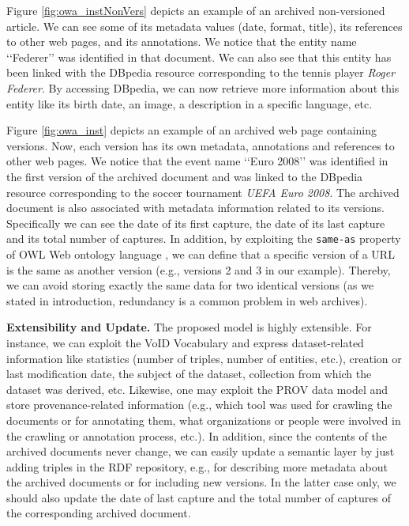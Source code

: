 \documentclass{libtex/sig-alternate-05-2015}
\newcommand{\q}[1]{\lq\lq{}{}#1\rq\rq{}{}}
\begin{document}
Figure \ref{fig:owa_instNonVers} depicts an example of an archived non-versioned article.
We can see some of its metadata values (date, format, title),
its references to other web pages, and its annotations.
We notice that the entity name \q{Federer} was identified
in that document.
We can also see that this entity has been linked with the DBpedia resource
corresponding to the tennis player {\em Roger Federer}.
By accessing DBpedia, we can now retrieve more information about this entity
like its birth date, an image, a description in a specific language, etc.

Figure \ref{fig:owa_inst} depicts an example of an archived web page containing versions.
Now, each version has its own metadata, annotations and references to other web pages.
We notice that the event name \q{Euro 2008} was identified in the first version of the archived document
and was linked to the DBpedia resource corresponding to the soccer tournament {\em UEFA Euro 2008}.
The archived document is also associated with metadata information related to its versions.
Specifically we can see the date of its first capture, the date of its last capture and
its total number of captures.
In addition, by exploiting the {\tt same-as} property of OWL Web ontology language \cite{bechhofer2009owl},
we can define that a specific version of a URL is the same as another version
(e.g., versions 2 and 3 in our example).
Thereby, we can avoid storing exactly the same data for two identical versions
(as we stated in introduction, redundancy is a common problem in web archives).


\vspace{0.5mm} \noindent
{\bf Extensibility and Update.}
The proposed model is highly extensible.
For instance, we can
exploit the VoID Vocabulary \cite{alexander2011describing}
and express dataset-related information like
statistics (number of triples, number of entities, etc.),
creation or last modification date,
the subject of the dataset,
collection from which the dataset was derived, etc.
Likewise, one may exploit the PROV data model \cite{moreau2013prov}
and store provenance-related information
(e.g., which tool was used for crawling the documents or for annotating them,
what organizations or people were involved in the crawling or annotation process,
etc.).
In addition, since the contents of the archived documents never change,
we can easily update a semantic layer by just
adding triples in the RDF repository,
e.g., for describing more metadata about the archived documents
or for including new versions.
In the latter case only, we should also
update the date of last capture
and the total number of captures of the corresponding
archived document.
\end{document}
